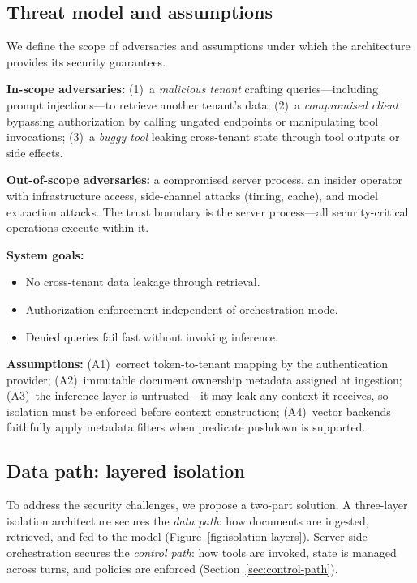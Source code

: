 \documentclass[sigconf]{acmart}
\begin{document}
\subsection{Threat model and assumptions}
\label{sec:threat-model}

We define the scope of adversaries and assumptions under which the architecture provides its security guarantees.

\textbf{In-scope adversaries:} (1)~a \emph{malicious tenant} crafting queries---including prompt injections---to retrieve another tenant's data; (2)~a \emph{compromised client} bypassing authorization by calling ungated endpoints or manipulating tool invocations; (3)~a \emph{buggy tool} leaking cross-tenant state through tool outputs or side effects.

\textbf{Out-of-scope adversaries:} a compromised server process, an insider operator with infrastructure access, side-channel attacks (timing, cache), and model extraction attacks. The trust boundary is the server process---all security-critical operations execute within it.

\textbf{System goals:}
\begin{itemize}
  \item[\textbf{G1}] No cross-tenant data leakage through retrieval.
  \item[\textbf{G2}] Authorization enforcement independent of orchestration mode.
  \item[\textbf{G3}] Denied queries fail fast without invoking inference.
\end{itemize}

\textbf{Assumptions:} (A1)~correct token-to-tenant mapping by the authentication provider; (A2)~immutable document ownership metadata assigned at ingestion; (A3)~the inference layer is untrusted---it may leak any context it receives, so isolation must be enforced before context construction; (A4)~vector backends faithfully apply metadata filters when predicate pushdown is supported.

\subsection{Data path: layered isolation}
\label{sec:data-path}
To address the security challenges, we propose a two-part solution.
A three-layer isolation architecture secures the \emph{data path}: how documents are ingested, retrieved, and fed to the model (Figure~\ref{fig:isolation-layers}).
Server-side orchestration secures the \emph{control path}: how tools are invoked, state is managed across turns, and policies are enforced (Section~\ref{sec:control-path}).
\end{document}
